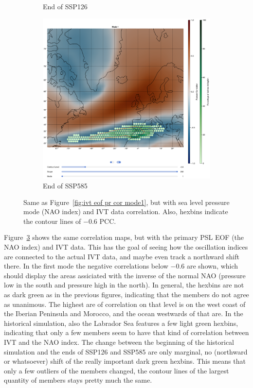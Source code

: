 \begin{figure}[!htb]
\begin{subfigure}[b]{0.32\textwidth}
    \caption{End of SSP126} 
    \label{fig:psl eof ivt cor ssp126 mode1}
  \end{subfigure}
  \begin{subfigure}[b]{0.32\textwidth}
    \includegraphics[width=\textwidth]{figures/psl_ivt_cor_mode1_ssp585.png}
    \caption{End of SSP585}
    \label{fig:psl eof ivt cor ssp585 mode1}
  \end{subfigure}
  \caption{Same as Figure~\ref{fig:ivt eof pr cor mode1}, but with sea level pressure mode (NAO index) and IVT data correlation. Also, hexbins indicate the contour lines of $-0.6$ PCC.}
  \label{fig:psl eof ivt cor mode1}
\end{figure}


Figure~\ref{fig:psl eof ivt cor mode1} shows the same correlation maps, but with the primary PSL EOF (the NAO index) and IVT data. 
This has the goal of seeing how the oscillation indices are connected to the actual IVT data, and maybe even track a northward shift there. 
In the first mode the negative correlations below $-0.6$ are shown, which should display the areas assiciated with the inverse of the normal NAO (pressure low in the south and pressure high in the north). 
In general, the hexbins are not as dark green as in the previous figures, indicating that the members do not agree as unanimous. 
The highest are of correlation on that level is on the west coast of the Iberian Peninsula and Morocco, and the ocean westwards of that are. 
In the historical simulation, also the Labrador Sea features a few light green hexbins, indicating that only a few members seem to have that kind of correlation between IVT and the NAO index. 
The change between the beginning of the historical simulation and the ends of SSP126 and SSP585 are only marginal, no (northward or whatsoever) shift of the really important dark green hexbins. 
This means that only a few outliers of the members changed, the contour lines of the largest quantity of members stays pretty much the same. 


